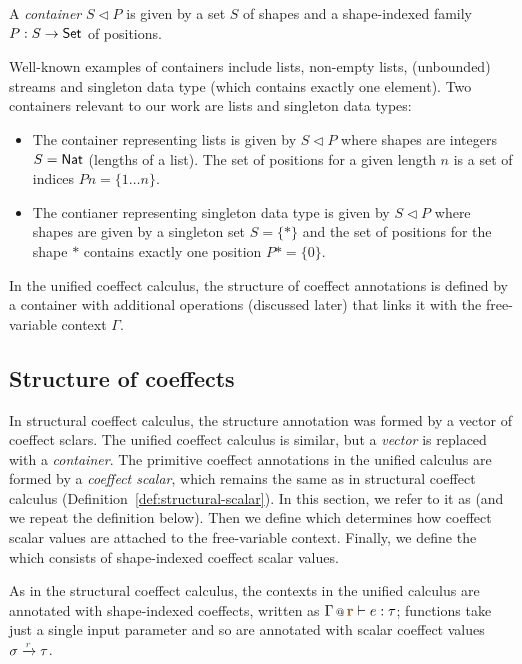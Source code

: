 \begin{definition}
A \emph{container} $S \triangleleft P$ is given by a set $S$ of shapes and a shape-indexed family
$P : S \rightarrow \textnormal{\sffamily Set}$ of positions.
\end{definition}

\noindent
Well-known examples of containers include lists, non-empty lists, (un\-boun\-ded) streams and 
singleton data type (which contains exactly one element). Two containers relevant to our work
are lists and singleton data types:

\begin{itemize}
\item The container representing lists is given by $S \triangleleft P$ where 
  shapes are integers $S = \ident{Nat}$ (lengths of a list). The set of positions for a 
  given length $n$ is a set of indices $P n = \{ 1 \ldots n \}$.

\item The contianer representing singleton data type is given by $S \triangleleft P$ where
  shapes are given by a singleton set $S = \{ \ast \}$ and the set of positions for the
  shape $\ast$ contains exactly one position $P \ast = \{ 0 \}$.
\end{itemize}

\noindent
In the unified coeffect calculus, the structure of coeffect annotations is defined by a 
container with additional operations (discussed later) that links it with the free-variable 
context $\Gamma$. 

\subsection{Structure of coeffects}
In structural coeffect calculus, the structure annotation was formed by a vector of coeffect
sclars. The unified coeffect calculus is similar, but a \emph{vector} is replaced with a 
\emph{container}. The primitive coeffect annotations in the unified calculus are formed by
a \emph{coeffect scalar}, which remains the same as in structural coeffect calculus
(Definition~\ref{def:structural-scalar}). In this section, we refer to it as
\emph{} (and we repeat the definition below). Then we
define \emph{} which determines how coeffect scalar values 
are attached to the free-variable context. Finally, we define the \emph{} which consists of shape-indexed coeffect scalar values.

As in the structural coeffect calculus, the contexts in the unified calculus are annotated with 
shape-indexed coeffects, written as $\coctx{\Gamma}{\aclrd{\textbf{r}}} \vdash e : \tau$; 
functions take just a single input parameter and so are annotated with scalar coeffect values 
$\sigma \xrightarrow{\cclrd{r}} \tau$.

